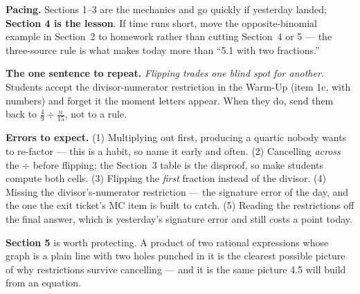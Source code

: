 \documentclass[10pt]{article}
\begin{document}
\begin{teachernote}
\textbf{Pacing.} Sections 1--3 are the mechanics and go quickly if yesterday landed; \textbf{Section 4
is the lesson}. If time runs short, move the opposite-binomial example in Section~2 to homework rather
than cutting Section~4 or 5 --- the three-source rule is what makes today more than ``5.1 with two
fractions.''

\vspace{3pt}
\textbf{The one sentence to repeat.} \emph{Flipping trades one blind spot for another.} Students accept
the divisor-numerator restriction in the Warm-Up (item 1c, with numbers) and forget it the moment
letters appear. When they do, send them back to $\frac49\div\frac{n}{15}$, not to a rule.

\vspace{3pt}
\textbf{Errors to expect.} (1) Multiplying out first, producing a quartic nobody wants to re-factor ---
this is a habit, so name it early and often. (2) Cancelling \emph{across} the $\div$ before flipping;
the Section~3 table is the disproof, so make students compute both cells. (3) Flipping the
\emph{first} fraction instead of the divisor. (4) Missing the divisor's-numerator restriction --- the
signature error of the day, and the one the exit ticket's MC item is built to catch. (5) Reading the
restrictions off the final answer, which is yesterday's signature error and still costs a point today.

\vspace{3pt}
\textbf{Section 5} is worth protecting. A product of two rational expressions whose graph is a plain
line with two holes punched in it is the clearest possible picture of why restrictions survive
cancelling --- and it is the same picture 4.5 will build from an equation.
\end{teachernote}
\end{document}

